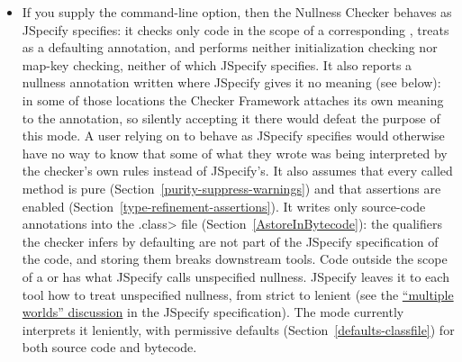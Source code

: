 \begin{enumerate}
\begin{itemize}
  By default, the checker forbids calls to those methods, and also
  special-cases type-checking of calls to
  and
  .
  A call to one of these methods
  can return null in general, but by default the Nullness Checker treats it
  as returning non-null if the argument is one of the literal strings
  listed in the documentation of
  .
  To make this behavior sound, the Nullness Checker forbids calls that
  might clear any built-in property, as described above.

\item
  If you supply the  command-line option, then the Nullness
  Checker behaves as JSpecify specifies:  it checks only code in the scope of a
  corresponding , treats 
  as a defaulting annotation, and performs neither initialization checking nor
  map-key checking, neither of which JSpecify specifies.
  It also reports a nullness annotation written where JSpecify gives it no meaning
  (see  below): in some of those locations the
  Checker Framework attaches its own meaning to the annotation, so silently accepting
  it there would defeat the purpose of this mode.  A user relying on
   to behave as JSpecify specifies would otherwise have no way
  to know that some of what they wrote was being interpreted by the checker's own
  rules instead of JSpecify's.
  It also assumes that every called method is pure
  (Section~\ref{purity-suppress-warnings}) and that assertions are enabled
  (Section~\ref{type-refinement-assertions}).
  It writes only source-code annotations into the \<.class> file
  (Section~\ref{AstoreInBytecode}):  the qualifiers the checker infers by
  defaulting are not part of the JSpecify specification of the code, and storing
  them breaks downstream tools.
  Code outside the scope of a  or  has what
  JSpecify calls unspecified nullness.  JSpecify leaves it to each tool how to treat
  unspecified nullness, from strict to lenient (see the
  \href{https://jspecify.dev/docs/spec/#multiple-worlds}{``multiple worlds'' discussion}
  in the JSpecify specification).  The mode currently interprets it leniently, with
  permissive defaults (Section~\ref{defaults-classfile}) for both source code and bytecode.

\end{itemize}
\end{enumerate}
